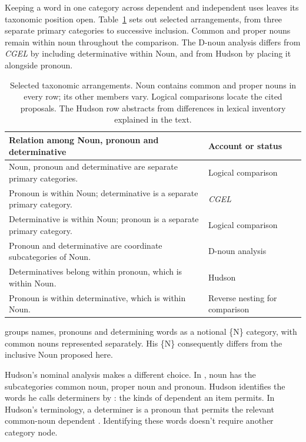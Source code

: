 \documentclass[12pt]{article}
\begin{document}
Keeping a word in one category across dependent and independent uses leaves its taxonomic position open. Table~\ref{tab:rivals} sets out selected arrangements, from three separate primary categories to successive inclusion. Common and proper nouns remain within noun throughout the comparison. The D-noun analysis differs from \textit{CGEL} by including determinative within Noun, and from Hudson by placing it alongside pronoun.

\begin{table}[tb]
\centering\small
\caption{Selected taxonomic arrangements. Noun contains common and proper nouns in every row; its other members vary. Logical comparisons locate the cited proposals. The Hudson row abstracts from differences in lexical inventory explained in the text.}\label{tab:rivals}
\begin{tabular}{>{\raggedright\arraybackslash}p{8.7cm}>{\raggedright\arraybackslash}p{3cm}}
\toprule
Relation among Noun, pronoun and determinative & Account or status \\
\midrule
Noun, pronoun and determinative are separate primary categories. & Logical comparison \\
Pronoun is within Noun; determinative is a separate primary category. & \textit{CGEL} \\
Determinative is within Noun; pronoun is a separate primary category. & Logical comparison \\
Pronoun and determinative are coordinate subcategories of Noun. & D-noun analysis \\
Determinatives belong within pronoun, which is within Noun. & Hudson \\
Pronoun is within determinative, which is within Noun. & Reverse nesting for comparison \\
\bottomrule
\end{tabular}
\end{table}

\textcite{anderson1997notional} groups names, pronouns and determining words as a notional \{N\} category, with common nouns represented separately. His \{N\} consequently differs from the inclusive Noun proposed here.

Hudson's nominal analysis makes a different choice. In \textcite[253--254]{hudson2010wordgrammar}, noun has the subcategories common noun, proper noun and pronoun. Hudson identifies the words he calls determiners by : the kinds of dependent an item permits. In Hudson's terminology, a determiner is a pronoun that permits the relevant common-noun dependent \citep[9--10]{hudson2004determiners}. Identifying these words doesn't require another category node.
\end{document}
